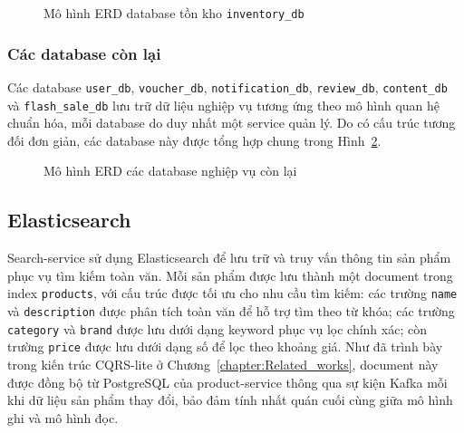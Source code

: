 \documentclass[../DoAn.tex]{subfiles}
\begin{document}
{\begin{figure}[!H]
    \centering
    \caption{Mô hình ERD database tồn kho \texttt{inventory\_db}}
    \label{fig:erd-inventory}
\end{figure}

\subsubsection*{Các database còn lại}

Các database \texttt{user\_db}, \texttt{voucher\_db}, \texttt{notification\_db},
\texttt{review\_db}, \texttt{content\_db} và \texttt{flash\_sale\_db} lưu trữ dữ liệu nghiệp
vụ tương ứng theo mô hình quan hệ chuẩn hóa, mỗi database do duy nhất một service quản lý. Do
có cấu trúc tương đối đơn giản, các database này được tổng hợp chung trong
Hình~\ref{fig:erd-others}.

\begin{figure}[!H]
    \centering
    \caption{Mô hình ERD các database nghiệp vụ còn lại}
    \label{fig:erd-others}
\end{figure}

\subsection{Elasticsearch}

Search-service sử dụng Elasticsearch để lưu trữ và truy vấn thông tin sản phẩm phục vụ tìm
kiếm toàn văn. Mỗi sản phẩm được lưu thành một document trong index \texttt{products}, với
cấu trúc được tối ưu cho nhu cầu tìm kiếm: các trường \texttt{name} và \texttt{description}
được phân tích toàn văn để hỗ trợ tìm theo từ khóa; các trường \texttt{category} và
\texttt{brand} được lưu dưới dạng keyword phục vụ lọc chính xác; còn trường \texttt{price}
được lưu dưới dạng số để lọc theo khoảng giá. Như đã trình bày trong kiến trúc CQRS-lite ở
Chương~\ref{chapter:Related_works}, document này được đồng bộ từ PostgreSQL của
product-service thông qua sự kiện Kafka mỗi khi dữ liệu sản phẩm thay đổi, bảo đảm tính nhất
quán cuối cùng giữa mô hình ghi và mô hình đọc.

}
\end{document}
